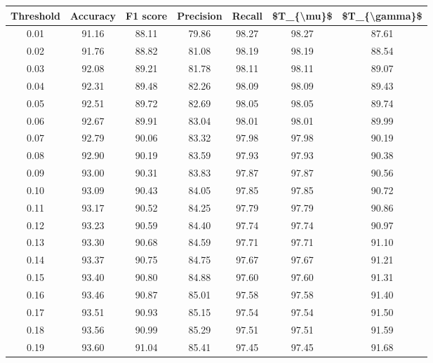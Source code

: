 \begin{tabular}{|c|c|c|c|c|c|c|}
\hline
 Threshold &  Accuracy &  F1 score &  Precision &  Recall &  \$T\_\{\textbackslash mu\}\$ &  \$T\_\{\textbackslash gamma\}\$ \\
\hline
      0.01 &     91.16 &     88.11 &      79.86 &   98.27 &      98.27 &         87.61 \\
      0.02 &     91.76 &     88.82 &      81.08 &   98.19 &      98.19 &         88.54 \\
      0.03 &     92.08 &     89.21 &      81.78 &   98.11 &      98.11 &         89.07 \\
      0.04 &     92.31 &     89.48 &      82.26 &   98.09 &      98.09 &         89.43 \\
      0.05 &     92.51 &     89.72 &      82.69 &   98.05 &      98.05 &         89.74 \\
      0.06 &     92.67 &     89.91 &      83.04 &   98.01 &      98.01 &         89.99 \\
      0.07 &     92.79 &     90.06 &      83.32 &   97.98 &      97.98 &         90.19 \\
      0.08 &     92.90 &     90.19 &      83.59 &   97.93 &      97.93 &         90.38 \\
      0.09 &     93.00 &     90.31 &      83.83 &   97.87 &      97.87 &         90.56 \\
      0.10 &     93.09 &     90.43 &      84.05 &   97.85 &      97.85 &         90.72 \\
      0.11 &     93.17 &     90.52 &      84.25 &   97.79 &      97.79 &         90.86 \\
      0.12 &     93.23 &     90.59 &      84.40 &   97.74 &      97.74 &         90.97 \\
      0.13 &     93.30 &     90.68 &      84.59 &   97.71 &      97.71 &         91.10 \\
      0.14 &     93.37 &     90.75 &      84.75 &   97.67 &      97.67 &         91.21 \\
      0.15 &     93.40 &     90.80 &      84.88 &   97.60 &      97.60 &         91.31 \\
      0.16 &     93.46 &     90.87 &      85.01 &   97.58 &      97.58 &         91.40 \\
      0.17 &     93.51 &     90.93 &      85.15 &   97.54 &      97.54 &         91.50 \\
      0.18 &     93.56 &     90.99 &      85.29 &   97.51 &      97.51 &         91.59 \\
      0.19 &     93.60 &     91.04 &      85.41 &   97.45 &      97.45 &         91.68 \\

\end{tabular}
